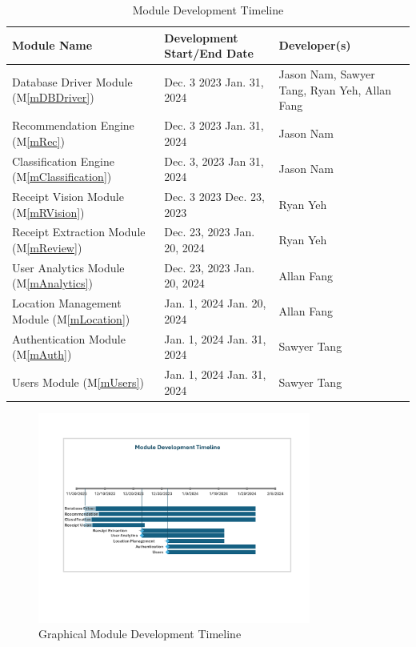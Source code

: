 \documentclass[12pt, titlepage]{article}
\newcommand{\mref}[1]{M\ref{#1}}
\begin{document}
\begin{table}[H]
  \caption{Module Development Timeline}\label{ModuleDevelopmentTimeline}
  \begin{tabular}{|p{}|p{}|p{}|}
    \hline
    \textbf{Module Name} & \textbf{Development Start/End Date} & \textbf{Developer(s)} \\
    \hline
    Database Driver Module (\mref{mDBDriver}) & Dec. 3 2023 \textemdash{} Jan. 31, 2024 & Jason Nam, Sawyer Tang, Ryan Yeh, Allan Fang \\
    \hline
    Recommendation Engine (\mref{mRec}) & Dec. 3 2023 \textemdash{} Jan. 31, 2024 & Jason Nam \\
    \hline
    Classification Engine (\mref{mClassification}) & Dec. 3, 2023 \textemdash{} Jan 31, 2024 & Jason Nam\\
    \hline
    Receipt Vision Module (\mref{mRVision}) & Dec. 3 2023 \textemdash{} Dec. 23, 2023 & Ryan Yeh \\
    \hline
    Receipt Extraction Module (\mref{mReview}) & Dec. 23, 2023 \textemdash{} Jan. 20, 2024 & Ryan Yeh \\
    \hline
    User Analytics Module (\mref{mAnalytics}) & Dec. 23, 2023 \textemdash{} Jan. 20, 2024 & Allan Fang \\
    \hline
    Location Management Module (\mref{mLocation}) & Jan. 1, 2024 \textemdash{} Jan. 20, 2024 & Allan Fang \\
    \hline
    Authentication Module (\mref{mAuth}) & Jan. 1, 2024 \textemdash{} Jan. 31, 2024 & Sawyer Tang \\
    \hline
    Users Module (\mref{mUsers}) & Jan. 1, 2024 \textemdash{} Jan. 31, 2024 & Sawyer Tang \\
    \hline
  \end{tabular}
\end{table}

\begin{figure}[H]
  \centering
  \caption{Graphical Module Development Timeline}\label{FigureModuleDevelopmentTimeline}
  \includegraphics[width=0.8\textwidth]{./res/ModuleDevTimeline.pdf}
\end{figure}
\end{document}
